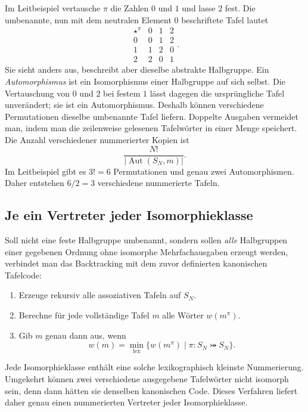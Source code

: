 \documentclass[main.tex]{subfiles}
\begin{document}
Im Leitbeispiel vertausche \(\pi\) die Zahlen \(0\) und \(1\) und lasse \(2\)
fest.  Die umbenannte, nun mit dem neutralen Element \(0\) beschriftete Tafel
lautet
\[
\begin{array}{c|ccc}
\star^\pi&0&1&2\\\hline
0&0&1&2\\
1&1&2&0\\
2&2&0&1
\end{array}.
\]
Sie sieht anders aus, beschreibt aber dieselbe abstrakte Halbgruppe.  Ein
\emph{Automorphismus} ist ein Isomorphismus einer Halbgruppe auf sich selbst.
Die Vertauschung von \(0\) und \(2\) bei festem \(1\) lässt dagegen die
ursprüngliche Tafel unverändert; sie ist ein Automorphismus.  Deshalb können
verschiedene Permutationen dieselbe umbenannte Tafel liefern.  Doppelte
Ausgaben vermeidet man, indem man die zeilenweise gelesenen Tafelwörter in
einer Menge speichert.  Die Anzahl verschiedener nummerierter Kopien ist
\[
  \frac{N!}{|\operatorname{Aut}(S_N,m)|}.
\]
Im Leitbeispiel gibt es \(3!=6\) Permutationen und genau zwei
Automorphismen.  Daher entstehen \(6/2=3\) verschiedene nummerierte Tafeln.


\subsection{Je ein Vertreter jeder Isomorphieklasse}

Soll nicht eine feste Halbgruppe umbenannt, sondern sollen \emph{alle}
Halbgruppen einer gegebenen Ordnung ohne isomorphe Mehrfachausgaben erzeugt
werden, verbindet man das Backtracking mit dem zuvor definierten kanonischen
Tafelcode:
\begin{enumerate}
  \item Erzeuge rekursiv alle assoziativen Tafeln auf \(S_N\).
  \item Berechne für jede vollständige Tafel \(m\) alle Wörter
    \(w(m^\pi)\).
  \item Gib \(m\) genau dann aus, wenn
    \[
      w(m)
      =
      \min_{\mathrm{lex}}
      \{w(m^\pi)\mid \pi\colon S_N\bij S_N\}.
    \]
\end{enumerate}
Jede Isomorphieklasse enthält eine solche lexikographisch kleinste
Nummerierung.  Umgekehrt können zwei verschiedene ausgegebene Tafelwörter
nicht isomorph sein, denn dann hätten sie denselben kanonischen Code.  Dieses
Verfahren liefert daher genau einen nummerierten Vertreter jeder
Isomorphieklasse.
\end{document}
